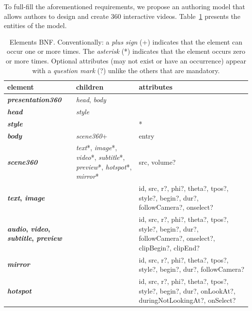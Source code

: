 To full-fill the aforementioned requirements, we propose an authoring model that allows authors to design and create 360 interactive videos. Table~\ref{tbl:entities} presents the entities of the model.
\begin{table}[!ht]
\footnotesize
\begin{tabularx}{\linewidth}{ p{3cm} p{4cm} X }
\hline

\textbf{element} & \textbf{children} & \textbf{attributes}\\ \hline

\textbf{\emph{presentation360}}  & \emph{head}, \emph{\emph{body}} &  \\ \hline

\textbf{\emph{head}}  & \emph{style} &  \\  \hline

\textbf{\emph{style}}  &  & * \\  \hline

\textbf{\emph{body}}  & \emph{scene360}+ & entry \\ \hline

\textbf{\emph{scene360}}  & \emph{text}*, \emph{image}*, \emph{video}*,
\emph{subtitle}*, \emph{preview}*, \emph{hotspot}*, \emph{mirror}* & src, volume? \\  \hline

\textbf{\emph{text}, \emph{image}}  &  & 
id, src, r?, phi?, theta?, tpos?, style?, begin?, dur?, followCamera?, onselect? \\ \hline

\textbf{\emph{audio}, \emph{video}, \emph{subtitle}, \emph{preview}}  &  & 
id, src, r?, phi?, theta?, tpos?, style?, begin?, dur?, followCamera?, onselect?, clipBegin?, clipEnd?\\ \hline

\textbf{\emph{mirror}}  &  & 
id, src, r?, phi?, theta?, tpos?, style?, begin?, dur?, 
followCamera? \\ \hline

\textbf{\emph{hotspot}}  &  & 
id, src, r?, phi?, theta?, tpos?, 
style?, begin?, dur?,  onLookAt?, duringNotLookingAt?, onSelect? \\ \hline

\hline
 \end{tabularx}
\caption{Elements BNF. Conventionally: a \emph{plus sign} (+) indicates that the element can occur one or more times. The \emph{asterisk} (*) indicates that the element occurs zero or more times. Optional attributes (may not exist or have an occurrence) appear with a \emph{question mark} (?) unlike the others that are mandatory. 
}
\label{tbl:entities}
\end{table}

